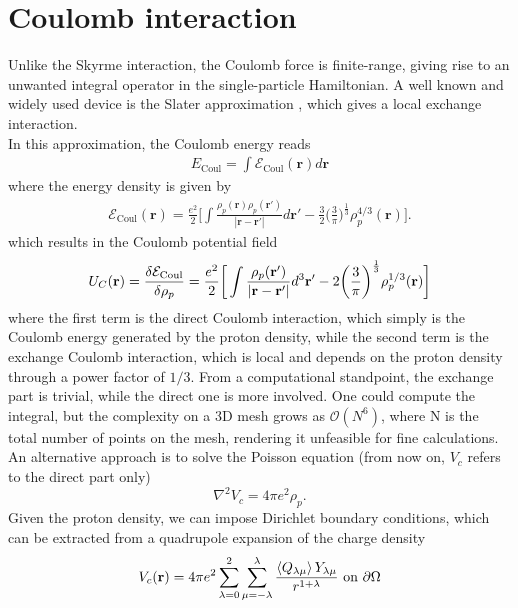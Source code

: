 \section{Coulomb interaction}
\label{sec:coulomb_treatment}
Unlike the Skyrme interaction, the Coulomb force is finite-range, giving rise to an unwanted integral operator in the single-particle Hamiltonian.
A well known and widely used device is the Slater approximation \cite{SlaterApp}, which gives a local exchange interaction.
\\In this approximation, the Coulomb energy reads
\begin{align*}
    E_\text{Coul} = \int \mathcal E_\text{Coul}(\mathbf r) d\bm r
\end{align*}
where the energy density is given by
\begin{align}
    \mathcal E_\text{Coul}(\bm r) = \frac{e^2}{2}\bigg[\int  \frac{\rho_p(\mathbf r )\rho_p(\mathbf r ' )}{|\mathbf r-\mathbf r'|}d\mathbf r'  - \frac 3 2 \bigg(\frac 3 \pi \bigg) ^{\frac 1 3}\rho_p^{4/3}(\mathbf r)\bigg].
\end{align}
which results in the Coulomb potential field
\begin{equation}
    U_{C}(\mathbf r) = \fdv{\mathcal E_\text{Coul}}{\rho_p} = \frac{e^2}{2}\bigg[\int \frac{\rho_p(\mathbf r ')}{|\mathbf r-\mathbf r'|} d^3 \mathbf r' - 2\bigg(\frac 3 \pi \bigg) ^{\frac 1 3} \rho_p^{1/3}(\mathbf r ) \bigg]
\end{equation}
where the first term is the direct Coulomb interaction, which simply is the Coulomb energy generated by the proton density, while the second term is the exchange Coulomb interaction, which is local and depends on the proton density through a power factor of $1/3$.
From a computational standpoint, the exchange part is trivial, while the direct one is more involved.
One could compute the integral, but the complexity on a 3D mesh grows as $\mathcal O(N^6)$, where N is the total number of points on the mesh, rendering it unfeasible for fine calculations. 
\\An alternative approach is to solve the Poisson equation (from now on, $V_c$ refers to the direct part only)
\begin{equation}
    \label{eq:poisson}
    \nabla^2 V_c = 4\pi e^2 \rho_p.
\end{equation}
Given the proton density, we can impose Dirichlet boundary conditions, which can be extracted from a quadrupole expansion of the charge density \cite{Jackson1998}
\begin{equation}
V_c (\mathbf r) = 4\pi e^2 \sum_{\lambda=0}^2\sum_{\mu=-\lambda}^\lambda \frac{\expval{Q_{\lambda\mu}} Y_{\lambda\mu}}{r^{1+\lambda}}\text{ on }\partial \Omega
\end{equation}
